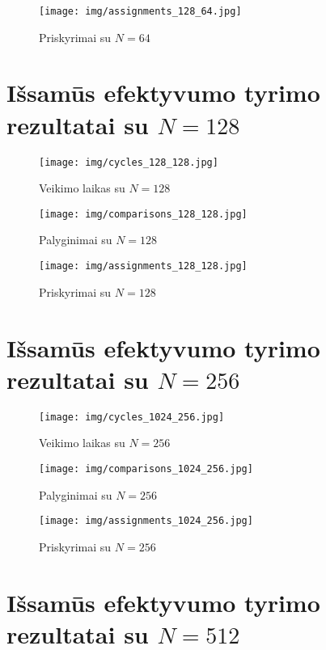 \documentclass{VUMIFInfBakalaurinis}
\begin{document}
\begin{figure}[H]
  \centering
  \texttt{[image: img/assignments\_128\_64.jpg]}
  \caption{Priskyrimai su $N = 64$}
\end{figure}

\section{Išsamūs efektyvumo tyrimo rezultatai su $N = 128$}

\begin{figure}[H]
  \centering
  \texttt{[image: img/cycles\_128\_128.jpg]}
  \caption{Veikimo laikas su $N = 128$}
\end{figure}

\begin{figure}[H]
  \centering
  \texttt{[image: img/comparisons\_128\_128.jpg]}
  \caption{Palyginimai su $N = 128$}
\end{figure}

\begin{figure}[H]
  \centering
  \texttt{[image: img/assignments\_128\_128.jpg]}
  \caption{Priskyrimai su $N = 128$}
\end{figure}

\section{Išsamūs efektyvumo tyrimo rezultatai su $N = 256$}

\begin{figure}[H]
  \centering
  \texttt{[image: img/cycles\_1024\_256.jpg]}
  \caption{Veikimo laikas su $N = 256$}
\end{figure}

\begin{figure}[H]
  \centering
  \texttt{[image: img/comparisons\_1024\_256.jpg]}
  \caption{Palyginimai su $N = 256$}
\end{figure}

\begin{figure}[H]
  \centering
  \texttt{[image: img/assignments\_1024\_256.jpg]}
  \caption{Priskyrimai su $N = 256$}
\end{figure}

\section{Išsamūs efektyvumo tyrimo rezultatai su $N = 512$}
\end{document}
